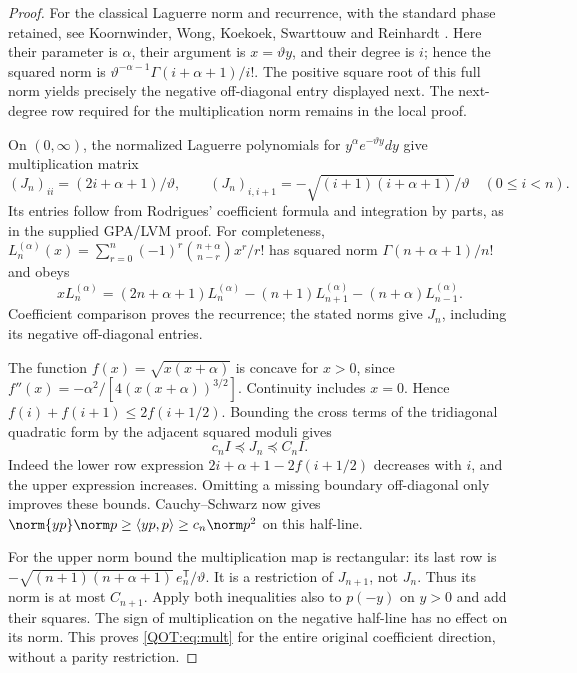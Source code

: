 \documentclass[11pt,a4paper]{article}
\begin{document}
\begin{proof}
For the classical Laguerre norm and recurrence, with the standard
phase retained, see Koornwinder, Wong, Koekoek, Swarttouw and Reinhardt
\cite[Table~18.3.1; eq.~(18.5.5) and Table~18.5.1;
eq.~(18.5.12); eq.~(18.9.1) and Table~18.9.1]{human:dlmf18}.
Here their parameter is $\alpha$, their argument is
$x=\vartheta y$, and their degree is $i$; hence the squared norm is
$\vartheta^{-\alpha-1}\Gamma(i+\alpha+1)/i!$.
The positive square root of this full norm yields precisely the
negative off-diagonal entry displayed next. The next-degree row
required for the multiplication norm remains in the local proof.

On $(0,\infty)$, the normalized Laguerre polynomials for $y^\alpha e^{-\vartheta y}dy$ give multiplication matrix
\[
 (J_n)_{ii}=(2i+\alpha+1)/\vartheta,\qquad
 (J_n)_{i,i+1}=-\sqrt{(i+1)(i+\alpha+1)}/\vartheta
 \quad(0\le i<n).
\]
Its entries follow from Rodrigues' coefficient formula and integration by parts, as in the supplied GPA/LVM proof. For completeness, $L_n^{(\alpha)}(x)=\sum_{r=0}^n(-1)^r\binom{n+\alpha}{n-r}x^r/r!$ has squared norm $\Gamma(n+\alpha+1)/n!$ and obeys
\[
 xL_n^{(\alpha)}=(2n+\alpha+1)L_n^{(\alpha)}
 -(n+1)L_{n+1}^{(\alpha)}-(n+\alpha)L_{n-1}^{(\alpha)}.
\]
Coefficient comparison proves the recurrence; the stated norms give $J_n$, including its negative off-diagonal entries.

The function $f(x)=\sqrt{x(x+\alpha)}$ is concave for $x>0$, since $f''(x)=-\alpha^2/[4(x(x+\alpha))^{3/2}]$. Continuity includes $x=0$. Hence $f(i)+f(i+1)\le2f(i+1/2)$. Bounding the cross terms of the tridiagonal quadratic form by the adjacent squared moduli gives
\[
 c_n I\preceq J_n\preceq C_n I.
\]
Indeed the lower row expression $2i+\alpha+1-2f(i+1/2)$ decreases with $i$, and the upper expression increases. Omitting a missing boundary off-diagonal only improves these bounds. Cauchy--Schwarz now gives $\norm{yp}\norm p\ge\langle yp,p\rangle\ge c_n\norm p^2$ on this half-line.

For the upper norm bound the multiplication map is rectangular: its last row is $-\sqrt{(n+1)(n+\alpha+1)}\,e_n^{\mathsf T}/\vartheta$. It is a restriction of $J_{n+1}$, not $J_n$. Thus its norm is at most $C_{n+1}$. Apply both inequalities also to $p(-y)$ on $y>0$ and add their squares. The sign of multiplication on the negative half-line has no effect on its norm. This proves \eqref{QOT:eq:mult} for the entire original coefficient direction, without a parity restriction.
\end{proof}
\end{document}

